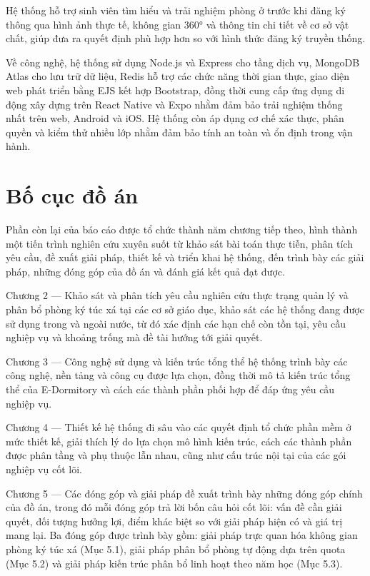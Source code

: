 \documentclass[../DoAn.tex]{subfiles}
\begin{document}
Hệ thống hỗ trợ sinh viên tìm hiểu và trải nghiệm phòng ở trước khi đăng ký thông qua hình ảnh thực tế, không gian 360° và thông tin chi tiết về cơ sở vật chất, giúp đưa ra quyết định phù hợp hơn so với hình thức đăng ký truyền thống.

Về công nghệ, hệ thống sử dụng Node.js và Express cho tầng dịch vụ, MongoDB Atlas cho lưu trữ dữ liệu, Redis hỗ trợ các chức năng thời gian thực, giao diện web phát triển bằng EJS kết hợp Bootstrap, đồng thời cung cấp ứng dụng di động xây dựng trên React Native và Expo nhằm đảm bảo trải nghiệm thống nhất trên web, Android và iOS. Hệ thống còn áp dụng cơ chế xác thực, phân quyền và kiểm thử nhiều lớp nhằm đảm bảo tính an toàn và ổn định trong vận hành.
\section{Bố cục đồ án}

\label{section:1.4}
Phần còn lại của báo cáo được tổ chức thành năm chương tiếp theo, hình thành một tiến trình nghiên cứu xuyên suốt từ khảo sát bài toán thực tiễn, phân tích yêu cầu, đề xuất giải pháp, thiết kế và triển khai hệ thống, đến trình bày các giải pháp, những đóng góp của đồ án và đánh giá kết quả đạt được.


Chương 2 — Khảo sát và phân tích yêu cầu nghiên cứu thực trạng quản lý và phân bổ phòng ký túc xá tại các cơ sở giáo dục, khảo sát các hệ thống đang được sử dụng trong và ngoài nước, từ đó xác định các hạn chế còn tồn tại, yêu cầu nghiệp vụ và khoảng trống mà đề tài hướng tới giải quyết.

Chương 3 — Công nghệ sử dụng và kiến trúc tổng thể hệ thống trình bày các công nghệ, nền tảng và công cụ được lựa chọn, đồng thời mô tả kiến trúc tổng thể của E-Dormitory và cách các thành phần phối hợp để đáp ứng yêu cầu nghiệp vụ.

Chương 4 — Thiết kế hệ thống đi sâu vào các quyết định tổ chức phần mềm ở mức thiết kế, giải thích lý do lựa chọn mô hình kiến trúc, cách các thành phần được phân tầng và phụ thuộc lẫn nhau, cũng như cấu trúc nội tại của các gói nghiệp vụ cốt lõi.

Chương 5 — Các đóng góp và giải pháp đề xuất trình bày những đóng góp chính của đồ án, trong đó mỗi đóng góp trả lời bốn câu hỏi cốt lõi: vấn đề cần giải quyết, đối tượng hưởng lợi, điểm khác biệt so với giải pháp hiện có và giá trị mang lại. Ba đóng góp được trình bày gồm: giải pháp trực quan hóa không gian phòng ký túc xá (Mục 5.1), giải pháp phân bổ phòng tự động dựa trên quota (Mục 5.2) và giải pháp kiến trúc phân bổ linh hoạt theo năm học (Mục 5.3).
\end{document}
